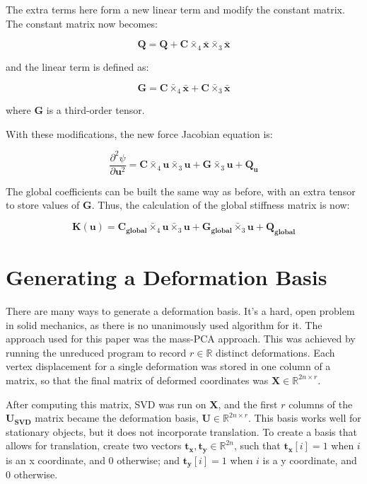\documentclass[twocolumn,10pt]{asme2ej}
\begin{document}
The extra terms here form a new linear term and modify the constant matrix. The constant matrix now becomes:

\begin{equation}
 \bm{Q} = \bm{Q} + \bm{C} \bar{\times}_4 \bm{\bar{x}} \bar{\times}_3 \bm{\bar{x}}
\end{equation}

\noindent and the linear term is defined as:

\begin{equation}
 \bm{G} = \bm{C} \bar{\times}_4 \bm{\bar{x}} + \bm{C} \bar{\times}_3 \bm{\bar{x}}
\end{equation}

\noindent where $\bm{G}$ is a third-order tensor.

With these modifications, the new force Jacobian equation is:

\begin{equation}
\frac{\partial^2 \psi}{\partial \bm{u}^2} = \bm{C} \bar{\times}_4 \bm{u} \bar{\times}_3 \bm{u}
+ \bm{G} \bar{\times}_3 \bm{u} + \bm{Q_u}
\end{equation}

The global coefficients can be built the same way as before, with an extra tensor to store values of $\bm{G}$. Thus, the calculation of the global stiffness matrix is now:

\begin{equation}
  \bm{K}(\bm{u}) = \bm{C_{global}} \bar{\times}_4 \bm{u} \bar{\times}_3 \bm{u}
  + \bm{G_{global}} \bar{\times}_3 \bm{u} + \bm{Q_{global}}
  \label{eq_globalStiffness}
\end{equation}

\section{Generating a Deformation Basis}

There are many ways to generate a deformation basis. It's a hard, open problem in solid mechanics, as there is no unanimously used algorithm for it. The approach used for this paper was the mass-PCA approach. This was achieved by running the unreduced program to record $r \in \mathbb{R}$ distinct deformations. Each vertex displacement for a single deformation was stored in one column of a matrix, so that the final matrix of deformed coordinates was $\bm{X} \in \mathbb{R}^{2n \times r}$.

After computing this matrix, SVD was run on $\bm{X}$, and the first $r$ columns of the $\bm{U_{SVD}}$ matrix became the deformation basis, $\bm{U} \in \mathbb{R}^{2n \times r}$. This basis works well for stationary objects, but it does not incorporate translation. To create a basis that allows for translation, create two vectors $\bm{t_x}, \bm{t_y} \in \mathbb{R}^{2n}$, such that
$\bm{t_x}[i] = 1$ when $i$ is an x coordinate, and $0$ otherwise;
and $\bm{t_y}[i] = 1$ when $i$ is a y coordinate, and $0$ otherwise.
\end{document}
